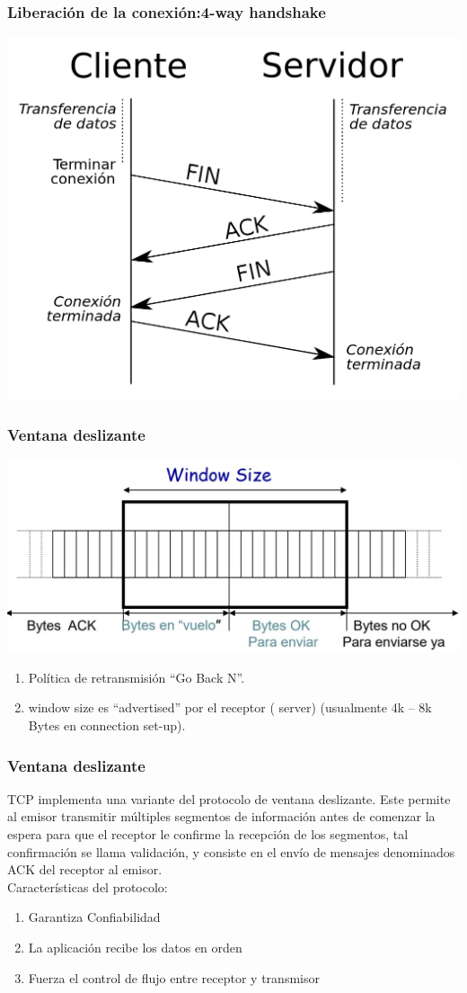 \documentclass{beamer}
\begin{document}
\begin{frame}
\frametitle{Liberación de la conexión:4-way handshake}
\includegraphics[scale=0.2]{4}\\
\end{frame}
\begin{frame}
	\frametitle{Ventana deslizante}
	\includegraphics[width=\textwidth]{ventdesl}
	\begin{enumerate}
		\item Política de retransmisión “Go Back N”.
		\item window size es “advertised” por el receptor ( server)
		(usualmente 4k – 8k Bytes en connection set-up).
	\end{enumerate}
\end{frame}
\begin{frame}
	\frametitle{Ventana deslizante}
	TCP implementa una variante del protocolo de ventana deslizante. Este permite al emisor transmitir múltiples segmentos de información antes de comenzar la espera para que el receptor le confirme la recepción de los segmentos, tal confirmación se llama validación, y consiste en el envío de mensajes denominados ACK del receptor al emisor. \\
	Características del protocolo:\\
	\begin{enumerate}
		\item Garantiza Confiabilidad
		\item La aplicación recibe los datos en orden
		\item Fuerza el control de flujo entre receptor y transmisor
	\end{enumerate}
\end{frame}
\end{document}
